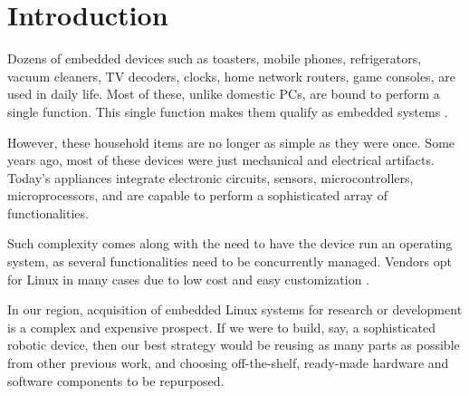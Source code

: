 \documentclass[conference]{IEEEtran}
\newcommand{\nota}[1]{}
\begin{document}
\section{Introduction}


\nota{
Existen decenas de dispositivos embebidos que utilizamos en la vida diaria.
Tostadoras, teléfonos móviles, heladeras, aspiradoras,
decodificadores de televisión, relojes, routers hogareños, consola de juegos, etc.
Y la mayoría de estos sistemas, a diferencia de una PC que puede
realizar miles de funciones diferentes, realizan una única función.
Esta única tarea define que nos encontramos ante sistemas embebidos \cite{steveheath}.
}
Dozens of embedded devices such as toasters, mobile phones, refrigerators, 
vacuum cleaners, TV decoders, clocks, home network routers, game consoles,  are used in daily life. Most of these, unlike domestic PCs, are bound to perform a single function. This single function makes them qualify as embedded systems \cite{steveheath}.


\nota{
Sin embargo, estos artículos del hogar ya no son tan simples como antes. Algunos
años atrás, la mayor parte de estos dispositivos fueron únicamente mecánicos
y eléctricos. En cambio, hoy en día, la mayoría incluye placas
de circuitos electrónicos, sensores, microcontroladores, microprocesadores y
funcionalidades sofisticadas.
}
However, these household items are no longer as simple as they were once. Some years ago,
most of these devices were just mechanical and electrical artifacts. Today's appliances
integrate electronic circuits, sensors, microcontrollers, microprocessors, 
and are capable to perform a sophisticated array of functionalities. 

\nota{
Esta complejidad trajo la necesidad de ejecutar un sistema operativo
dentro del dispositivo, ya
que se necesita administrar varias funcionalidades al mismo tiempo.
Actualmente, los fabricantes han optado por Linux en muchos
casos, debido principalmente a su
bajo costo y su gran adaptabilidad (referencia electrolux brasil, celular android, router linux)
}
Such complexity comes along with the need to have the device run an operating system, as several functionalities need to be concurrently managed. Vendors opt for Linux in many cases due to low cost and easy customization \cite{electrolux, android}.

\nota{En el marco regional, adquirir sistemas Linux embebidos para investigación
o desarrollo es complejo y costoso.
Si fuese necesario, por ejemplo, construir un sofisticado dispositivo robótico
en nuestra realidad, reutilizaríamos, dentro de lo posible, la mayor cantidad de partes de otros
trabajos previos, como así también componentes de hardware y software
preexistentes, que puedan adaptarse cuando y donde se necesite.
}
In our region, acquisition of embedded Linux systems for research or development is a complex and expensive prospect. If we were to build, say, a sophisticated robotic device, then our best strategy would be reusing as many parts as possible from other previous work, and choosing off-the-shelf, ready-made hardware and software components to be repurposed.
\end{document}
